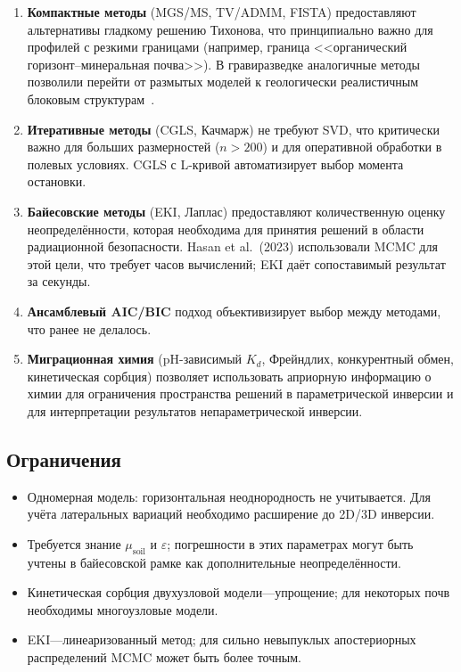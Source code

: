 \documentclass[12pt,a4paper]{article}
\begin{document}
\begin{enumerate}[leftmargin=*,itemsep=3pt]
  \item \textbf{Компактные методы} (MGS/MS, TV/ADMM, FISTA) предоставляют
        альтернативы гладкому решению Тихонова, что принципиально важно
        для профилей с резкими границами (например, граница
        <<органический горизонт--минеральная почва>>).
        В гравиразведке аналогичные методы позволили перейти
        от размытых моделей к геологически реалистичным
        блоковым структурам~\citep{Portniaguine1999, Vatankhah2018}.

  \item \textbf{Итеративные методы} (CGLS, Качмарж) не требуют SVD,
        что критически важно для больших размерностей ($n > 200$)
        и для оперативной обработки в полевых условиях.
        CGLS с L-кривой автоматизирует выбор момента остановки.

  \item \textbf{Байесовские методы} (EKI, Лаплас) предоставляют
        количественную оценку неопределённости, которая необходима
        для принятия решений в области радиационной безопасности.
        Hasan et al.~(2023) использовали MCMC для этой цели,
        что требует часов вычислений; EKI даёт сопоставимый
        результат за секунды.

  \item \textbf{Ансамблевый AIC/BIC} подход объективизирует выбор
        между методами, что ранее не делалось.

  \item \textbf{Миграционная химия} (pH-зависимый $K_d$, Фрейндлих,
        конкурентный обмен, кинетическая сорбция) позволяет
        использовать априорную информацию о химии
        для ограничения пространства решений в параметрической
        инверсии и для интерпретации результатов
        непараметрической инверсии.
\end{enumerate}

\subsection{Ограничения}
\label{sub:limitations}

\begin{itemize}[leftmargin=*,itemsep=2pt]
  \item Одномерная модель: горизонтальная неоднородность не учитывается.
        Для учёта латеральных вариаций необходимо расширение
        до 2D/3D инверсии.
  \item Требуется знание $\mu_{\mathrm{soil}}$ и $\varepsilon$;
        погрешности в этих параметрах могут быть учтены
        в байесовской рамке как дополнительные неопределённости.
  \item Кинетическая сорбция двухузловой модели---упрощение;
        для некоторых почв необходимы многоузловые модели.
  \item EKI---линеаризованный метод; для сильно
        невыпуклых апостериорных распределений MCMC может быть
        более точным.
\end{itemize}
\end{document}
